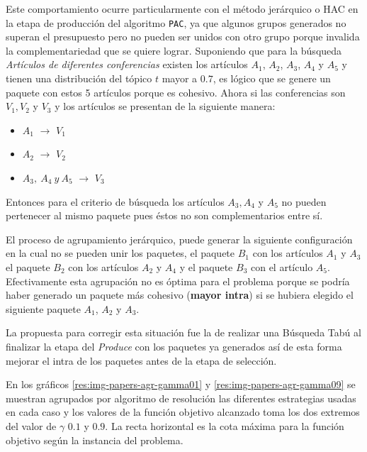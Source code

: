 Este comportamiento ocurre particularmente con el método jerárquico o HAC en la etapa de producción del algoritmo \texttt{PAC}, ya que algunos grupos generados no superan el presupuesto pero no pueden ser unidos con otro grupo porque invalida la complementariedad que se quiere lograr. Suponiendo que para la búsqueda \textit{Artículos de diferentes conferencias} existen los artículos $A_1$, $A_2$, $A_3$, $A_4$ y $A_5$ y tienen una distribución del tópico $t$ mayor a $0.7$, es lógico que se genere un paquete con estos 5 artículos porque es cohesivo. Ahora si las conferencias son $V_1, V_2$ y $V_3$ y los artículos se presentan de la siguiente manera:
\begin{itemize}
	\item $A_1$ $\rightarrow$ $V_1$
	\item $A_2$ $\rightarrow$ $V_2$
	\item $A_3,\ A_4\ y\ A_5$ $\rightarrow$ $V_3$
\end{itemize} 

Entonces para el criterio de búsqueda los artículos $A_3, A_4$ y $A_5$ no pueden pertenecer al mismo paquete pues éstos no son complementarios entre sí.

El proceso de agrupamiento jerárquico, puede generar la siguiente configuración en la cual no se pueden unir los paquetes, el paquete $B_1$ con los artículos $A_1$ y $A_3$ el paquete $B_2$ con los artículos $A_2$ y $A_4$ y el paquete $B_3$ con el artículo $A_5$. Efectivamente esta agrupación no es óptima para el problema porque se podría haber generado un paquete más cohesivo (\textbf{mayor intra}) si se hubiera elegido el siguiente paquete $A_1$, $A_2$ y $A_3$.

La propuesta para corregir esta situación fue la de realizar una Búsqueda Tabú al finalizar la etapa del \textit{Produce} con los paquetes ya generados así de esta forma mejorar el intra de los paquetes antes de la etapa de selección.

\newpage

En los gráficos \ref{res:img-papers-agr-gamma01} y \ref{res:img-papers-agr-gamma09} se muestran agrupados por algoritmo de resolución las diferentes estrategias usadas en cada caso y los valores de la función objetivo alcanzado toma los dos extremos del valor de $\gamma$ $0.1$ y $0.9$. La recta horizontal es la cota máxima para la función objetivo según la instancia del problema.

